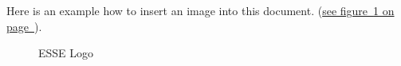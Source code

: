 \documentclass[12pt,a4paper,titlepage,oneside]{scrartcl}
\begin{document}
Here is an example how to insert an image into this document.
(\hyperref[fig:logo1]{see figure~\ref*{fig:logo1} on page~\pageref*{fig:logo1}}).

\begin{figure}[h!]
  \centering
  \caption{ESSE Logo}
  \label{fig:logo1}
\end{figure}


%
%
\end{document}
